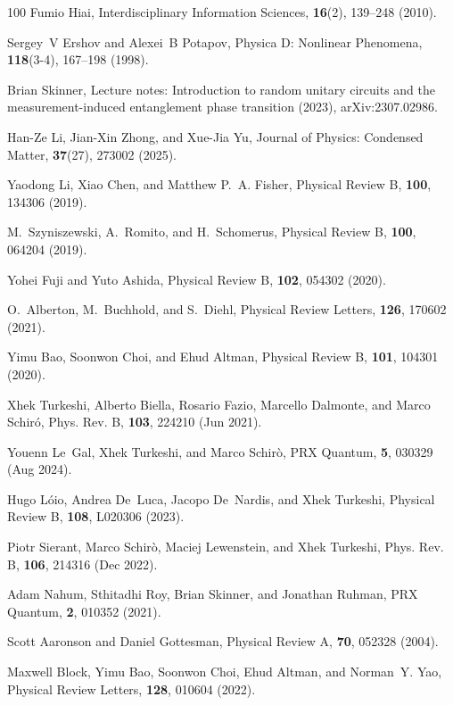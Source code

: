 \documentclass[preprint,pteplogo]{ptephy_v2}%
\numberwithin{equation}{section}
\theoremstyle{definition}
\begin{document}
\begin{thebibliography}{100}
Fumio Hiai, Interdisciplinary Information Sciences, {\bf 16}(2), 139--248 (2010).

Sergey~V Ershov and Alexei~B Potapov, Physica D: Nonlinear Phenomena, {\bf 118}(3-4), 167--198 (1998).

Brian Skinner,
\newblock Lecture notes: Introduction to random unitary circuits and the measurement-induced entanglement phase transition (2023),  {{arXiv:2307.02986}}.

Han-Ze Li, Jian-Xin Zhong, and Xue-Jia Yu, Journal of Physics: Condensed Matter, {\bf 37}(27), 273002 (2025).

Yaodong Li, Xiao Chen, and Matthew P.~A. Fisher, Physical Review B, {\bf 100}, 134306 (2019).

M.~Szyniszewski, A.~Romito, and H.~Schomerus, Physical Review B, {\bf 100}, 064204 (2019).

Yohei Fuji and Yuto Ashida, Physical Review B, {\bf 102}, 054302 (2020).

O.~Alberton, M.~Buchhold, and S.~Diehl, Physical Review Letters, {\bf 126}, 170602 (2021).

Yimu Bao, Soonwon Choi, and Ehud Altman, Physical Review B, {\bf 101}, 104301 (2020).

Xhek Turkeshi, Alberto Biella, Rosario Fazio, Marcello Dalmonte, and Marco Schir\'o, Phys. Rev. B, {\bf 103}, 224210 (Jun 2021).

Youenn Le~Gal, Xhek Turkeshi, and Marco Schir\`o, PRX Quantum, {\bf 5}, 030329 (Aug 2024).

Hugo L\'oio, Andrea De~Luca, Jacopo De~Nardis, and Xhek Turkeshi, Physical Review B, {\bf 108}, L020306 (2023).

Piotr Sierant, Marco Schir\`o, Maciej Lewenstein, and Xhek Turkeshi, Phys. Rev. B, {\bf 106}, 214316 (Dec 2022).

Adam Nahum, Sthitadhi Roy, Brian Skinner, and Jonathan Ruhman, PRX Quantum, {\bf 2}, 010352 (2021).

Scott Aaronson and Daniel Gottesman, Physical Review A, {\bf 70}, 052328 (2004).

Maxwell Block, Yimu Bao, Soonwon Choi, Ehud Altman, and Norman~Y. Yao, Physical Review Letters, {\bf 128}, 010604 (2022).


\end{thebibliography}
\end{document}
